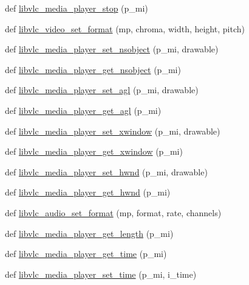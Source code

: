 \begin{DoxyCompactItemize}
\item 
def \hyperlink{namespacesrc_1_1lib_1_1vlc_aeee46e42106669e6fffecd9af8135bb5}{libvlc\+\_\+media\+\_\+player\+\_\+stop} (p\+\_\+mi)
\item 
def \hyperlink{namespacesrc_1_1lib_1_1vlc_a674eb3de55eb2a4ccb8ba0703ba930f7}{libvlc\+\_\+video\+\_\+set\+\_\+format} (mp, chroma, width, height, pitch)
\item 
def \hyperlink{namespacesrc_1_1lib_1_1vlc_a3190024713a49a0d016d39923cc08768}{libvlc\+\_\+media\+\_\+player\+\_\+set\+\_\+nsobject} (p\+\_\+mi, drawable)
\item 
def \hyperlink{namespacesrc_1_1lib_1_1vlc_aa125a622452cb467a4c80ac6f9dc231f}{libvlc\+\_\+media\+\_\+player\+\_\+get\+\_\+nsobject} (p\+\_\+mi)
\item 
def \hyperlink{namespacesrc_1_1lib_1_1vlc_aa54f4e16f255e118dd31025d84017ec2}{libvlc\+\_\+media\+\_\+player\+\_\+set\+\_\+agl} (p\+\_\+mi, drawable)
\item 
def \hyperlink{namespacesrc_1_1lib_1_1vlc_ae3e6192af8c4ea6c5fd73c7014f95f26}{libvlc\+\_\+media\+\_\+player\+\_\+get\+\_\+agl} (p\+\_\+mi)
\item 
def \hyperlink{namespacesrc_1_1lib_1_1vlc_a808364d4e843467245806c0ad68811c6}{libvlc\+\_\+media\+\_\+player\+\_\+set\+\_\+xwindow} (p\+\_\+mi, drawable)
\item 
def \hyperlink{namespacesrc_1_1lib_1_1vlc_ad8027a00f712dc4a6acc8c8c23bcf730}{libvlc\+\_\+media\+\_\+player\+\_\+get\+\_\+xwindow} (p\+\_\+mi)
\item 
def \hyperlink{namespacesrc_1_1lib_1_1vlc_a82ef6a66463c9e70542c2d7bea42afb9}{libvlc\+\_\+media\+\_\+player\+\_\+set\+\_\+hwnd} (p\+\_\+mi, drawable)
\item 
def \hyperlink{namespacesrc_1_1lib_1_1vlc_ad8d5162e987deabcfbfa8e94e994db8c}{libvlc\+\_\+media\+\_\+player\+\_\+get\+\_\+hwnd} (p\+\_\+mi)
\item 
def \hyperlink{namespacesrc_1_1lib_1_1vlc_aaa18cb9bd4b6bbb591764194470cf2d8}{libvlc\+\_\+audio\+\_\+set\+\_\+format} (mp, format, rate, channels)
\item 
def \hyperlink{namespacesrc_1_1lib_1_1vlc_a587c8a0d61db5e16a6c318979699e3de}{libvlc\+\_\+media\+\_\+player\+\_\+get\+\_\+length} (p\+\_\+mi)
\item 
def \hyperlink{namespacesrc_1_1lib_1_1vlc_a7c61776073418bd798e3b02ca770059a}{libvlc\+\_\+media\+\_\+player\+\_\+get\+\_\+time} (p\+\_\+mi)
\item 
def \hyperlink{namespacesrc_1_1lib_1_1vlc_a8e9d550616ffa46b43ef305b18cf815a}{libvlc\+\_\+media\+\_\+player\+\_\+set\+\_\+time} (p\+\_\+mi, i\+\_\+time)

\end{DoxyCompactItemize}
